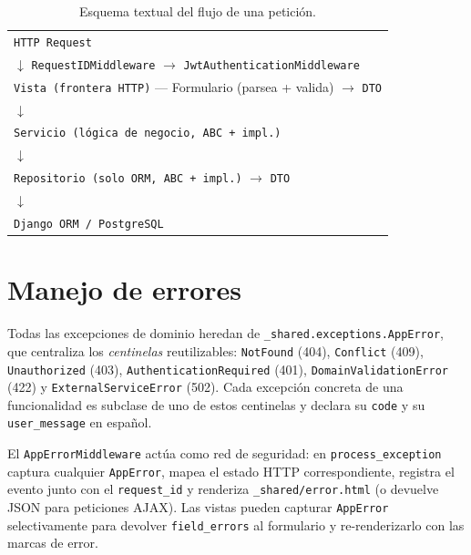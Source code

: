 \documentclass[12pt,letterpaper]{report}
\begin{document}
\begin{table}[H]
\centering
\caption{Esquema textual del flujo de una petición.}
\begin{tabularx}{\textwidth}{X}
\toprule
\texttt{HTTP Request} \\
\quad$\downarrow$ \texttt{RequestIDMiddleware} $\rightarrow$ \texttt{JwtAuthenticationMiddleware} \\
\texttt{Vista (frontera HTTP)} --- Formulario (parsea + valida) $\rightarrow$ \texttt{DTO} \\
\quad$\downarrow$ \\
\texttt{Servicio (lógica de negocio, ABC + impl.)} \\
\quad$\downarrow$ \\
\texttt{Repositorio (solo ORM, ABC + impl.)} $\rightarrow$ \texttt{DTO} \\
\quad$\downarrow$ \\
\texttt{Django ORM / PostgreSQL} \\
\bottomrule
\end{tabularx}
\end{table}

\section{Manejo de errores}

Todas las excepciones de dominio heredan de \texttt{\_shared.exceptions.AppError},
que centraliza los \textit{centinelas} reutilizables: \texttt{NotFound} (404),
\texttt{Conflict} (409), \texttt{Unauthorized} (403),
\texttt{AuthenticationRequired} (401), \texttt{DomainValidationError} (422) y
\texttt{ExternalServiceError} (502). Cada excepción concreta de una funcionalidad
es subclase de uno de estos centinelas y declara su \texttt{code} y su
\texttt{user\_message} en español.

El \texttt{AppErrorMiddleware} actúa como red de seguridad: en
\texttt{process\_exception} captura cualquier \texttt{AppError}, mapea el estado
HTTP correspondiente, registra el evento junto con el \texttt{request\_id} y
renderiza \texttt{\_shared/error.html} (o devuelve JSON para peticiones AJAX).
Las vistas pueden capturar \texttt{AppError} selectivamente para devolver
\texttt{field\_errors} al formulario y re-renderizarlo con las marcas de error.
\end{document}
